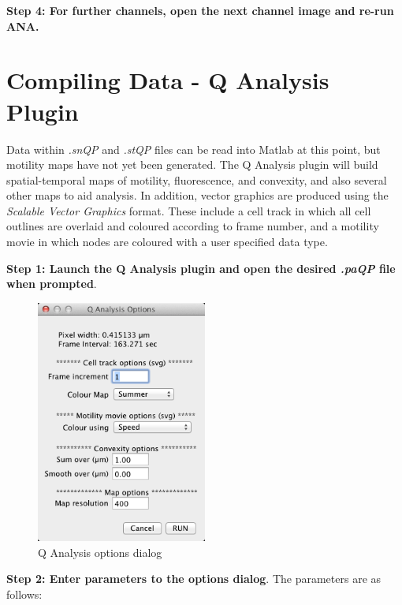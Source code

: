 \documentclass[a4paper,12pt]{article}
\begin{document}
\textbf{Step 4: For further channels, open the next channel image and re-run ANA.}

\section{Compiling Data - Q Analysis Plugin}

Data within \textit{.snQP} and \textit{.stQP} files can be read into Matlab at this point, but motility maps have not yet been generated.
The Q Analysis plugin will build spatial-temporal maps of motility, fluorescence, and convexity,
and also several other maps to aid analysis.  In addition, vector graphics are produced 
using the \textit{Scalable Vector Graphics} format.  These include a cell track in which all cell outlines are overlaid and coloured
according to frame number, and a motility movie in which nodes are coloured with a user specified data type.

\textbf{Step 1: Launch the Q Analysis plugin and open the desired \textit{.paQP} file when prompted}.

\begin{figure}[ht]
   \centering
   \includegraphics[height=8cm]{screenQAnalysis.png} 
   \caption{Q Analysis options dialog}
   \label{screenQAnalysis}
\end{figure}

\textbf{Step 2: Enter parameters to the options dialog}.  The parameters are as follows:
\end{document}
